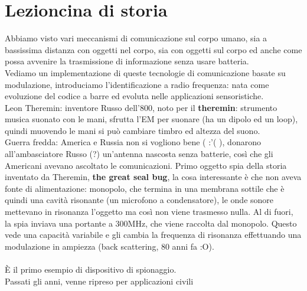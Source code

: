 \documentclass[oneside, 12pt]{extbook}
\begin{document}
\section{Lezioncina di storia}
Abbiamo visto vari meccanismi di comunicazione sul corpo umano, sia a bassissima distanza con oggetti nel corpo, sia con oggetti sul corpo ed anche come possa avvenire la trasmissione di informazione senza usare batteria.\\Vediamo un implementazione di queste tecnologie di comunicazione basate su modulazione, introduciamo l'identificazione a radio frequenza: nata come evoluzione del codice a barre ed evoluta nelle applicazioni sensoristiche.\\Leon Theremin: inventore Russo dell'800, noto per il \textbf{theremin}: strumento musica suonato con le mani, sfrutta l'EM per suonare (ha un dipolo ed un loop), quindi muovendo le mani si può cambiare timbro ed altezza del suono.\\Guerra fredda: America e Russia non si vogliono bene ( :'( ), donarono all'ambasciatore Russo (?) un'antenna nascosta senza batterie, così che gli Americani avevano ascoltato le comunicazioni. Primo oggetto spia della storia inventato da Theremin, \textbf{the great seal bug}, la cosa interessante è che non aveva fonte di alimentazione: monopolo, che termina in una membrana sottile che è quindi una cavità risonante (un microfono a condensatore), le onde sonore mettevano in risonanza l'oggetto ma così non viene trasmesso nulla. Al di fuori, la spia inviava una portante a 300MHz, che viene raccolta dal monopolo. Questo vede una capacità variabile e gli cambia la frequenza di risonanza effettuando una modulazione in ampiezza (back scattering, 80 anni fa :O).\\\\È il primo esempio di dispositivo di spionaggio.\\Passati gli anni, venne ripreso per applicazioni civili
\end{document}
